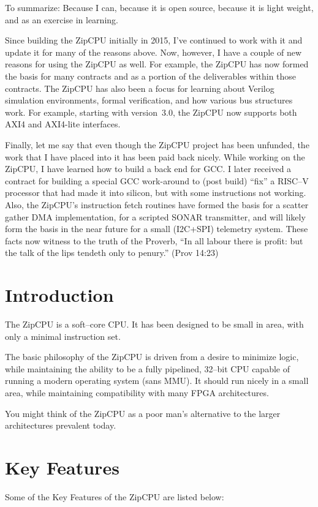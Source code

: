 \documentclass{gqtekspec}
\begin{document}
\begin{preface}
To summarize: Because I can, because it is open source, because it is light
weight, and as an exercise in learning. 

Since building the ZipCPU initially in 2015, I've continued to work with it and
update it for many of the reasons above.  Now, however, I have a couple of new
reasons for using the ZipCPU as well.  For example, the ZipCPU has now formed
the basis for many contracts and as a portion of the deliverables within those
contracts.  The ZipCPU has also been a focus for learning about Verilog
simulation environments, formal verification, and how various bus structures
work.  For example, starting with version~3.0, the ZipCPU now supports
both AXI4 and AXI4-lite interfaces.

Finally, let me say that even though the ZipCPU project has been unfunded, the
work that I have placed into it has been paid back nicely.  While working on
the ZipCPU, I have learned how to build a back end for GCC.  I later received
a contract for building a special GCC work-around to (post build) ``fix'' a
RISC--V processor that had made it into silicon, but with some instructions
not working.  Also, the ZipCPU's instruction fetch routines have formed the
basis for a scatter gather DMA implementation, for a scripted SONAR
transmitter, and will likely form the basis in the near future for a small
(I2C+SPI) telemetry system.  These facts now witness to the truth of the
Proverb, ``In all labour there is profit: but the talk of the lips tendeth
only to penury.'' (Prov 14:23)
\end{preface}

\chapter{Introduction}
\setcounter{page}{1}

The ZipCPU is a soft--core CPU.  It has been designed to be small in area,
with only a minimal instruction set.

The basic philosophy of the ZipCPU is driven from a desire to minimize
logic, while maintaining the ability to be a fully pipelined, 32--bit
CPU capable of running a modern operating system (sans MMU).  It should run
nicely in a small area, while maintaining compatibility with many FPGA
architectures.

You might think of the ZipCPU as a poor man's alternative to the larger
architectures prevalent today.
\chapter{Key Features}\label{chap:features}
Some of the Key Features of the ZipCPU are listed below:
\end{document}
